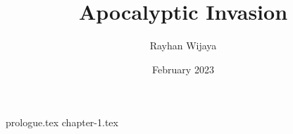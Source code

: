 \documentclass[12pt]{report}
\title{Apocalyptic Invasion}
\author{Rayhan Wijaya}
\date{February 2023}
\begin{document}
\maketitle

{prologue.tex}
{chapter-1.tex}
\end{document}
